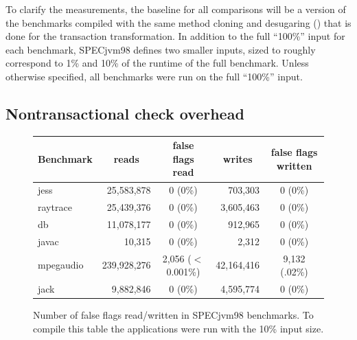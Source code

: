 To clarify
the measurements, the baseline for all comparisons will be a
version of the benchmarks compiled with the same method cloning and
desugaring () that is done for the transaction
transformation.
In addition to the full ``100\%'' input for each benchmark,
SPECjvm98 defines two smaller inputs, sized to roughly correspond to
1\% and 10\% of the runtime of the full benchmark.  Unless otherwise
specified, all benchmarks were run on the full ``100\%'' input.

\subsection{Nontransactional check overhead}



\begin{figure}\small %
\begin{tabular}{|l||r|c||r|c|}
Benchmark &\multicolumn{1}{c|}{reads}& false flags read &\multicolumn{1}{c|}{writes}& false flags written
\\ \hline
jess &      25,583,878 & 0  (0\%)&  703,303  &  0  (0\%) \\
raytrace &  25,439,376 & 0  (0\%)&3,605,463  &  0  (0\%) \\
db &        11,078,177 & 0  (0\%)&  912,965  &  0  (0\%) \\
javac &         10,315 & 0  (0\%)&    2,312  &  0  (0\%) \\
mpegaudio& 239,928,276 & 2,056  ($<$0.001\%)&  42,164,416  &  9,132 (.02\%) \\
jack &       9,882,846 & 0  (0\%)& 4,595,774 &  0 (0\%) \\ \hline
\end{tabular}
\caption[Number of false flags read/written in SPECjvm98 benchmarks.]
{Number of false flags read/written in SPECjvm98 benchmarks.  To
  compile this table the
  applications were run with the 10\% input size.}
\label{fig:false-flag}
\end{figure}

